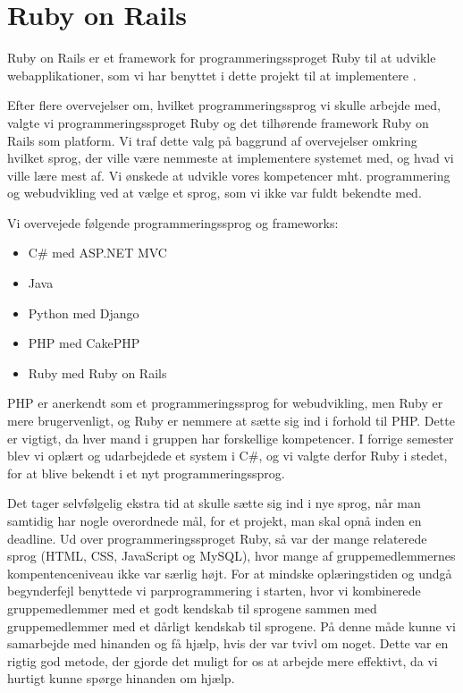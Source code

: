 \chapter{Ruby on Rails}
\label{akademiskror}

Ruby on Rails er et framework for programmeringssproget Ruby til at udvikle webapplikationer, som vi har benyttet i dette projekt til at implementere {\Foodl}.

Efter flere overvejelser om, hvilket programmeringssprog vi skulle arbejde med, valgte vi programmeringssproget Ruby og det tilhørende framework Ruby on Rails som platform. Vi traf dette valg på baggrund af overvejelser omkring hvilket sprog, der ville være nemmeste at implementere systemet med, og hvad vi ville lære mest af. Vi ønskede at udvikle vores kompetencer mht. programmering og webudvikling ved at vælge et sprog, som vi ikke var fuldt bekendte med. 

Vi overvejede følgende programmeringssprog og frameworks:

\begin{itemize}[noitemsep]
\item C\# med ASP.NET MVC
\item Java
\item Python med Django
\item PHP med CakePHP
\item Ruby med Ruby on Rails
\end{itemize}

PHP er anerkendt som et programmeringssprog for webudvikling, men Ruby er mere brugervenligt, og Ruby er nemmere at sætte sig ind i forhold til PHP. Dette er vigtigt, da hver mand i gruppen har forskellige kompetencer. I forrige semester blev vi oplært og udarbejdede et system i C\#, og vi valgte derfor Ruby i stedet, for at blive bekendt i et nyt programmeringssprog.

Det tager selvfølgelig ekstra tid at skulle sætte sig ind i nye sprog, når man samtidig har nogle overordnede mål, for et projekt, man skal opnå inden en deadline. Ud over programmeringssproget Ruby, så var der mange relaterede sprog (HTML, CSS, JavaScript og MySQL), hvor mange af gruppemedlemmernes kompentenceniveau ikke var særlig højt. For at mindske oplæringstiden og undgå begynderfejl benyttede vi parprogrammering i starten, hvor vi kombinerede gruppemedlemmer med et godt kendskab til sprogene sammen med gruppemedlemmer med et dårligt kendskab til sprogene. På denne måde kunne vi samarbejde med hinanden og få hjælp, hvis der var tvivl om noget. Dette var en rigtig god metode, der gjorde det muligt for os at arbejde mere effektivt, da vi hurtigt kunne spørge hinanden om hjælp.

